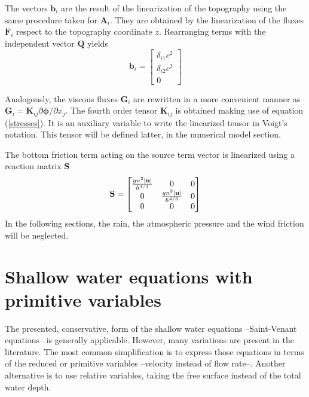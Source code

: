 The vectors $\mathbf{b}_i$ are the result of the linearization of the topography using the same procedure taken for $\mathbf{A}_i$. They are obtained by the linearization of the fluxes $\mathbf{F}_i$ respect to the topography coordinate $z$. Rearranging terms with the independent vector $\mathbf{Q}$ yields
\begin{equation}
    \mathbf{b}_i = \left[\begin{matrix}
        \delta_{i1} c^2 \\
        \delta_{i2} c^2 \\
        0
    \end{matrix}\right]
\end{equation}


Analogously, the viscous fluxes $\mathbf{G}_i$ are rewritten in a more convenient manner as ${\mathbf{G}_i = \mathbf{K}_{ij} \partial\bm{\phi}/\partial x_j}$. The fourth order tensor $\mathbf{K}_{ij}$ is obtained making use of equation (\ref{stresses}). It is an auxiliary variable to write the linearized tensor in Voigt's notation. This tensor will be defined latter, in the numerical model section.




The bottom friction term acting on the source term vector is linearized using a reaction matrix $\mathbf{S}$
\begin{equation}
\mathbf{S} = \left[\begin{matrix}
    \frac{gn^2\lvert\mathbf{u}\rvert}{h^{4/3}} & 0 & 0 \\
    0 & \frac{gn^2\lvert\mathbf{u}\rvert}{h^{4/3}} & 0 \\
    0 & 0 & 0
\end{matrix}\right]
\end{equation}
In the following sections, the rain, the atmospheric pressure and the wind friction will be neglected.








\section{Shallow water equations with primitive variables}


The presented, conservative, form of the shallow water equations --Saint-Venant equations-- is generally applicable. However, many variations are present in the literature.
The most common simplification is to express those equations in terms of the reduced or primitive variables --velocity instead of flow rate--.
Another alternative is to use relative variables, taking the free surface instead of the total water depth.

